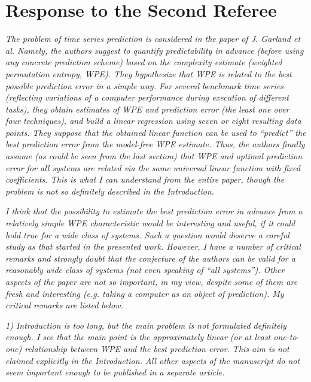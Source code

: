 \documentclass[12pt]{article}
\begin{document}
\section*{Response to the Second Referee}

\emph{The problem of time series prediction is considered in the paper of J.
Garland et al. Namely, the authors suggest to quantify predictability in advance
(before using any concrete prediction scheme) based on the complexity estimate
(weighted permutation entropy, WPE). They hypothesize that WPE is related to the
best possible prediction error in a simple way. For several benchmark time
series (reflecting variations of a computer performance during execution of
different tasks), they obtain estimates of WPE and prediction error (the least
one over four techniques), and build a linear regression using seven or eight
resulting data points. They suppose that the obtained linear function can be
used to ``predict'' the best prediction error from the model-free WPE estimate.
Thus, the authors finally assume (as could be seen from the last section) that
WPE and optimal prediction error for all systems are related via the same
universal linear function with fixed coefficients. This is what I can understand
from the entire paper, though the problem is not so definitely described in the
Introduction.}

\emph{I think that the possibility to estimate the best prediction error in
advance from a relatively simple WPE characteristic would be interesting and
useful, if it could hold true for a wide class of systems. Such a question would
deserve a careful study as that started in the presented work. However, I have a
number of critical remarks and strongly doubt that the conjecture of the authors
can be valid for a reasonably wide class of systems (not even speaking of ``all
systems''). Other aspects of the paper are not so important, in my view, despite
some of them are fresh and interesting (e.g. taking a computer as an object of
prediction). My critical remarks are listed below.}

\emph{1) Introduction is too long, but the main problem is not formulated
definitely enough. I see that the main point is the approximately linear (or at
least one-to-one) relationship between WPE and the best prediction error. This
aim is not claimed explicitly in the Introduction. All other aspects of the
manuscript do not seem important enough to be published in a separate article.}
\end{document}

